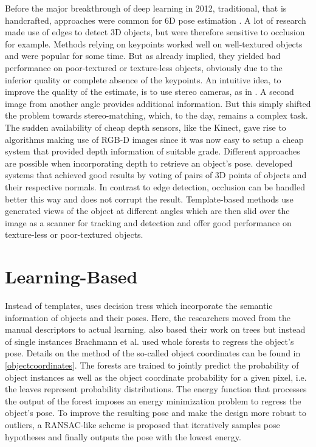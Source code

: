 Before the major breakthrough of deep learning in 2012, traditional, that is handcrafted, approaches were common for 6D pose estimation \cite{ylecun}. A lot of research \cite{gklein,dglowe2,charris} made use of edges to detect 3D objects, but were therefore sensitive to occlusion for example. Methods relying on keypoints \cite{dglowe1, dwagner} worked well on well-textured objects and were popular for some time. But as already implied, they yielded bad performance on poor-textured or texture-less objects, obviously due to the inferior quality or complete absence of the keypoints. An intuitive idea, to improve the quality of the estimate, is to use stereo cameras, as in \cite{kpauwels}. A second image from another angle provides additional information. But this simply shifted the problem towards stereo-matching, which, to the day, remains a complex task. The sudden availability of cheap depth sensors, like the Kinect, gave rise to algorithms making use of RGB-D images since it was now easy to setup a cheap system that provided depth information of suitable grade. Different approaches are possible when incorporating depth to retrieve an object's pose. \cite{bdrost, salasmoreno} developed systems that achieved good results by voting of pairs of 3D points of objects and their respective normals. In contrast to edge detection, occlusion can be handled better this way and does not corrupt the result. Template-based methods \cite{hinterstoisser1, hinterstoisser2, rioscabrera, csteger} use generated views of the object at different angles which are then slid over the image as a scanner  for tracking and detection and offer good performance on texture-less or poor-textured objects. 

\section{Learning-Based}

Instead of templates, \cite{klai} uses decision tress which incorporate the semantic information of objects and their poses. Here, the researchers moved from the manual descriptors to actual learning. \cite{brachmann1} also based their work on trees but instead of single instances Brachmann et al. used whole forests to regress the object's pose. Details on the method of the so-called object coordinates can be found in \ref{objectcoordinates}. The forests are trained to jointly predict the probability of object instances as well as the object coordinate probability for a given pixel, i.e. the leaves represent probability distributions. The energy function that processes the output of the forest imposes an energy minimization problem to regress the object's pose. To improve the resulting pose and make the design more robust to outliers, a RANSAC-like scheme is proposed that iteratively samples pose hypotheses and finally outputs the pose with the lowest energy.

